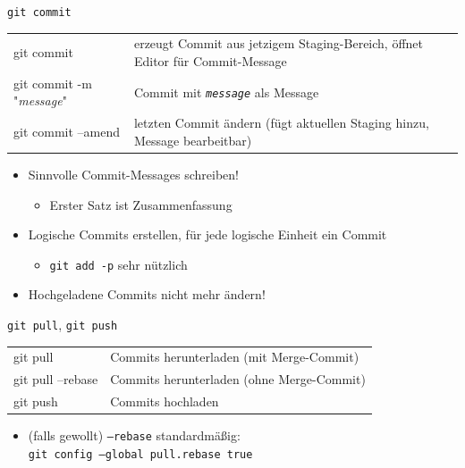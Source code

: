 \begin{frame}{\texttt{git commit}}
  \begin{tabu}{>{\ttfamily}l X}
    git commit                       & erzeugt Commit aus jetzigem Staging-Bereich, öffnet Editor für Commit-Message \\
    git commit -m "\textit{message}" & Commit mit \texttt{\textit{message}} als Message \\
    git commit --amend               & letzten Commit ändern (fügt aktuellen Staging hinzu, Message bearbeitbar)
  \end{tabu}

  \begin{itemize}
    \item Sinnvolle Commit-Messages schreiben!
      \begin{itemize}
        \item Erster Satz ist Zusammenfassung
      \end{itemize}
    \item Logische Commits erstellen, für jede logische Einheit ein Commit
      \begin{itemize}
        \item \texttt{git add -p} sehr nützlich
      \end{itemize}
    \item Hochgeladene Commits nicht mehr ändern!
  \end{itemize}
\end{frame}

\begin{frame}{\texttt{git pull}, \texttt{git push}}
  \begin{tabu}{>{\ttfamily}l X}
    git pull          & Commits herunterladen (mit Merge-Commit) \\
    git pull --rebase & Commits herunterladen (ohne Merge-Commit) \\
    git push          & Commits hochladen
  \end{tabu}

  \begin{itemize}
    \item (falls gewollt) \texttt{--rebase} standardmäßig: \\
      \texttt{git config --global pull.rebase true}
  \end{itemize}
\end{frame}

